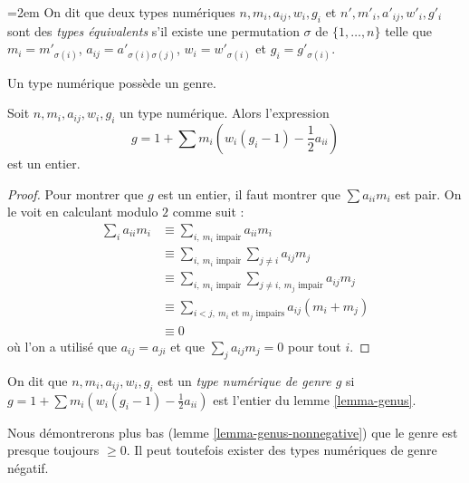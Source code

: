 \begin{definition}
\label{definition-type-equivalent}
\begingroup
\emergencystretch=2em
On dit que deux types numériques $n,\allowbreak m_i,\allowbreak a_{ij},\allowbreak w_i,\allowbreak g_i$ et
$n',\allowbreak m'_i,\allowbreak a'_{ij},\allowbreak w'_i,\allowbreak g'_i$ sont des {\it types équivalents} s'il
existe une permutation $\sigma$ de $\{1, \ldots, n\}$
telle que $m_i = m'_{\sigma(i)}$, $a_{ij} = a'_{\sigma(i)\sigma(j)}$,
$w_i = w'_{\sigma(i)}$ et $g_i = g'_{\sigma(i)}$.
\par
\endgroup
\end{definition}

\noindent
Un type numérique possède un genre.

\begin{lemma}
\label{lemma-genus}
Soit $n, m_i, a_{ij}, w_i, g_i$ un type numérique. Alors l'expression
$$
g = 1 + \sum m_i(w_i(g_i - 1) - \frac{1}{2} a_{ii})
$$
est un entier.
\end{lemma}

\begin{proof}
Pour montrer que $g$ est un entier, il faut montrer que $\sum a_{ii}m_i$ est pair.
On le voit en calculant modulo $2$ comme suit :
\begin{align*}
\sum\nolimits_i a_{ii} m_i 
& \equiv
\sum\nolimits_{i,\ m_i\text{ impair}} a_{ii}m_i \\
& \equiv
\sum\nolimits_{i,\ m_i\text{ impair}} \sum\nolimits_{j \not = i} a_{ij}m_j \\
& \equiv
\sum\nolimits_{i,\ m_i\text{ impair}}
\sum\nolimits_{j \not = i,\ m_j\text{ impair}} a_{ij}m_j \\
& \equiv
\sum\nolimits_{i < j,\ m_i\text{ et }m_j\text{ impairs}} a_{ij}(m_i + m_j) \\
& \equiv
0
\end{align*}
où l'on a utilisé que $a_{ij} = a_{ji}$ et que $\sum_j a_{ij}m_j = 0$
pour tout $i$.
\end{proof}

\begin{definition}
\label{definition-genus}
On dit que $n, m_i, a_{ij}, w_i, g_i$ est un {\it type numérique de genre $g$}
si $g = 1 + \sum m_i(w_i(g_i - 1) - \frac{1}{2} a_{ii})$ est l'entier
du lemme \ref{lemma-genus}.
\end{definition}

\noindent
Nous démontrerons plus bas (lemme \ref{lemma-genus-nonnegative}) que le genre
est presque toujours $\geq 0$. Il peut toutefois exister des types numériques de
genre négatif.

